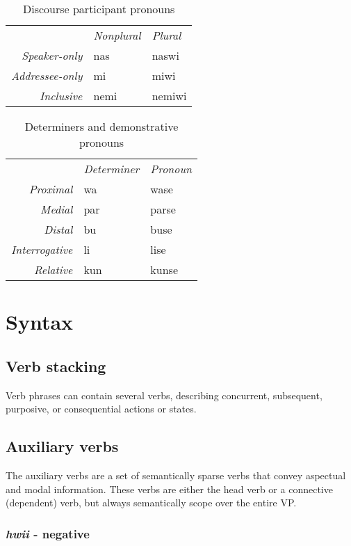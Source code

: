 \documentclass[a4paper,10pt,twoside,openright]{memoir}
\begin{document}
\begin{table}[ht]
    \centering
    \begin{tabular}{rll}
        & \textit{Nonplural} & \textit{Plural} \\
    \textit{Speaker-only} & nas & naswi \\
    \textit{Addressee-only} & mi & miwi \\
    \textit{Inclusive} & nemi & nemiwi \\
    \end{tabular}
    \caption{Discourse participant pronouns}
    \label{tab:firstandsecond}
\end{table}

\begin{table}[ht]
    \centering
    \begin{tabular}{>{\em}rll}
        & \textit{Determiner} & \textit{Pronoun}  \\
    Proximal & wa & wase \\
    Medial & par & parse \\
    Distal & bu & buse \\
    Interrogative & li & lise \\
    Relative & kun & kunse 
    \end{tabular}
    \caption{Determiners and demonstrative pronouns}
    \label{tab:determiners}
\end{table}

\chapter{Syntax}

\section{Verb stacking}

Verb phrases can contain several verbs, describing concurrent, subsequent, purposive, or consequential actions or states.

\section{Auxiliary verbs}

The auxiliary verbs are a set of semantically sparse verbs that convey aspectual and modal information. These verbs are either the head verb or a connective (dependent) verb, but always semantically scope over the entire VP.

\subsection{\emph{hwii} - negative}
\end{document}
